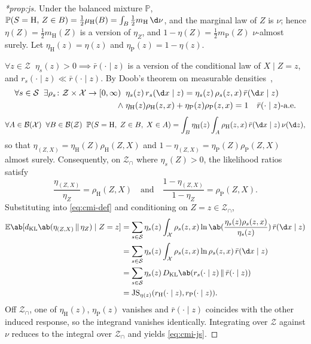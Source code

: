 \documentclass[12pt]{article}
\newcommand{\Herwig}{\mathrm{H}}
\newcommand{\Pythia}{\mathrm{P}}
\newcommand{\E}{\mathbb{E}}
\newcommand{\Prb}{\mathbb{P}}
\newcommand{\KL}{D_{\mathrm{KL}}}
\newcommand{\kl}{d_{\mathrm{KL}}}
\newcommand{\JS}{\mathrm{JS}}
\newcommand{\Gens}{\mathcal{S}}
\newcommand{\Borel}{\mathcal{B}}
\newcommand{\supp}{\mathcal{Z}_{\cap}}
\newcommand{\1}{\mathbbm{1}}
\renewcommand{\[}{\begin{equation}}
\renewcommand{\]}{\end{equation}}
\begin{document}
\begin{proof}[*prop:js]
        Under the balanced mixture \(\Prb\), \(\Prb(S=\Herwig,\,Z\in B)=\tfrac12\mu_\Herwig(B)=\int_B\tfrac12m_\Herwig\,\d\nu\), and the marginal law of \(Z\) is \(\nu\); hence \(\eta(Z)=\tfrac12m_\Herwig(Z)\) is a version of \(\eta_Z\), and \(1-\eta(Z)=\tfrac12m_\Pythia(Z)\) \(\nu\)-almost surely.
        Let \(\eta_\Herwig(z) = \eta(z)\) and \(\eta_\Pythia(z) = 1 - \eta(z)\).
        
        \(\forall z \in \mathcal Z\;\;\eta_s(z) > 0 \implies \bar r(\cdot \mid z)\) is a version of the conditional law of \(X\mid Z=z\), and \(r_s(\cdot \mid z) \ll \bar r(\cdot\mid z)\).
        By Doob's theorem on measurable densities~\cite{Kallenberg:2021},
        \[
            \begin{split}
                \forall s \in\Gens \;\; \exists \rho_s\colon\mathcal Z\times\mathcal X\to[0,\infty) \;\; &\eta_s(z)\, r_s(\d x\mid z)=\eta_s(z)\,\rho_s(z,x)\,\bar r(\d x\mid z) \\ \land\;&\eta_\Herwig(z) \rho_\Herwig(z,x) + \eta_\Pythia(z) \rho_\Pythia(z,x)=1\quad \bar r(\cdot\mid z)\text{-a.e.}
            \end{split}
        \]
        \[
            \forall A \in \Borel(\mathcal X)\;\; \forall B \in \Borel(\mathcal Z)\;\;\Prb(S=\Herwig,\;Z\in B,\;X\in A)=\int_B\eta_\Herwig(z)\int_A\rho_\Herwig(z,x)\,\bar r(\d x\mid z)\,\nu(\d z),
        \]
        so that \(\eta_{(Z,X)}=\eta_\Herwig(Z)\rho_\Herwig(Z,X)\) and \(1-\eta_{(Z,X)}=\eta_\Pythia(Z)\rho_\Pythia(Z,X)\) almost surely.
        Consequently, on \(\supp\) where \(\eta_s(Z) > 0\), the likelihood ratios satisfy
        \[
            \frac{\eta_{(Z,X)}}{\eta_Z} = \rho_\Herwig(Z,X) \quad \text{and} \quad \frac{1-\eta_{(Z,X)}}{1-\eta_Z} = \rho_\Pythia(Z,X).
        \]
        Substituting into \cref{eq:cmi-def} and conditioning on \(Z=z \in \supp\),
        \[
            \begin{split}
            \E\ab[\kl\ab(\eta_{(Z,X)}\,\|\,\eta_Z)\mid Z=z]
            &= \sum_{s\in\Gens}\eta_s(z)\int_{\mathcal X} \rho_s(z,x)\ln\ab(\frac{\eta_s(z)\rho_s(z,x)}{\eta_s(z)})\,\bar r(\d x\mid z) \\
            &= \sum_{s\in\Gens}\eta_s(z)\int_{\mathcal X} \rho_s(z,x)\ln\rho_s(z,x)\,\bar r(\d x\mid z) \\
            &= \sum_{s\in\Gens}\eta_s(z)\,\KL\ab(r_s(\cdot\mid z)\,\|\,\bar r(\cdot\mid z)) \\
            &= \JS_{\eta(z)}(r_\Herwig(\cdot\mid z),r_\Pythia(\cdot\mid z)).
            \end{split}
        \]
        Off \(\supp\), one of \(\eta_\Herwig(z)\), \(\eta_\Pythia(z)\) vanishes and \(\bar r(\cdot\mid z)\) coincides with the other induced response, so the integrand vanishes identically.
        Integrating over \(\mathcal Z\) against \(\nu\) reduces to the integral over \(\supp\) and yields \cref{eq:cmi-js}.
    \end{proof}
\end{document}
